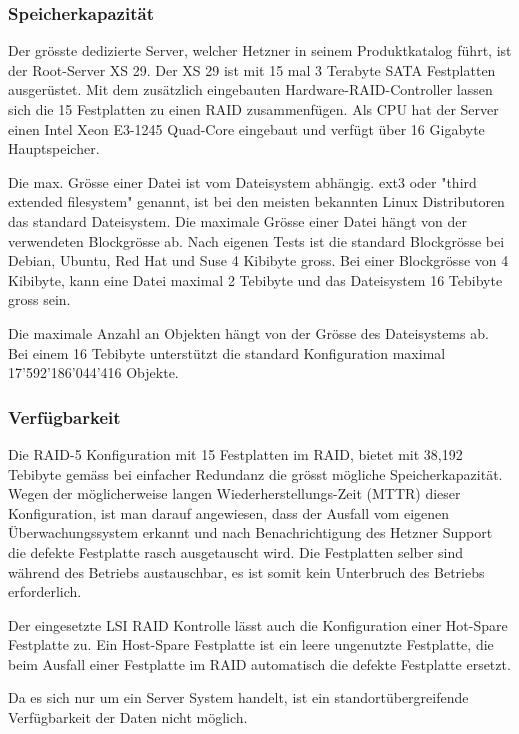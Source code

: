 \subsubsection*{Speicherkapazität}
Der grösste dedizierte Server, welcher Hetzner in seinem Produktkatalog führt, ist der Root-Server XS 29. Der XS 29 ist mit 15 mal 3 Terabyte SATA Festplatten ausgerüstet. Mit dem zusätzlich eingebauten Hardware-RAID-Controller lassen sich die 15 Festplatten zu einen RAID zusammenfügen.
Als CPU hat der Server einen Intel Xeon E3-1245 Quad-Core eingebaut und verfügt über 16 Gigabyte Hauptspeicher. 

Die max. Grösse einer Datei ist vom Dateisystem abhängig. ext3 oder "third extended filesystem" genannt, ist bei den meisten bekannten Linux Distributoren das standard Dateisystem. Die maximale Grösse einer Datei hängt von der verwendeten Blockgrösse ab. Nach eigenen Tests ist die standard Blockgrösse bei Debian, Ubuntu, Red Hat und Suse 4 Kibibyte gross. Bei einer Blockgrösse von 4 Kibibyte, kann eine Datei maximal 2 Tebibyte und das Dateisystem 16 Tebibyte gross sein. \cite{Card1993}

Die maximale Anzahl an Objekten hängt von der Grösse des Dateisystems ab. Bei einem 16 Tebibyte unterstützt die standard Konfiguration maximal 17'592'186'044'416 Objekte. 

\subsubsection*{Verfügbarkeit}
Die RAID-5 Konfiguration mit 15 Festplatten im RAID, bietet mit 38,192 Tebibyte gemäss  bei einfacher Redundanz die grösst mögliche Speicherkapazität. Wegen der möglicherweise langen Wiederherstellungs-Zeit (MTTR) dieser Konfiguration, ist man darauf angewiesen, dass der Ausfall vom eigenen Überwachungssystem erkannt und nach Benachrichtigung des Hetzner Support die defekte Festplatte rasch ausgetauscht wird. Die Festplatten selber sind während des Betriebs austauschbar, es ist somit kein Unterbruch des Betriebs erforderlich.

Der eingesetzte LSI RAID Kontrolle lässt auch die Konfiguration einer Hot-Spare Festplatte zu. Ein Host-Spare Festplatte ist ein leere ungenutzte Festplatte, die beim Ausfall einer Festplatte im RAID automatisch die defekte Festplatte ersetzt. 

Da es sich nur um ein Server System handelt, ist ein standortübergreifende Verfügbarkeit der Daten nicht möglich.


